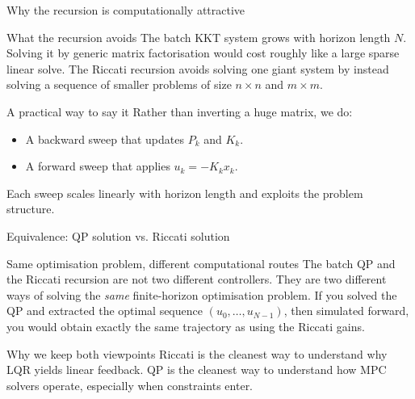 \documentclass[aspectratio=169,11pt]{beamer}
\begin{document}
\begin{frame}{Why the recursion is computationally attractive}
\begin{block}{What the recursion avoids}
The batch KKT system grows with horizon length $N$. Solving it by generic matrix factorisation would cost roughly like a large sparse linear solve.
The Riccati recursion avoids solving one giant system by instead solving a sequence of smaller problems of size $n\times n$ and $m\times m$.
\end{block}

\begin{exampleblock}{A practical way to say it}
Rather than inverting a huge matrix, we do:
\begin{itemize}
  \item A backward sweep that updates $P_k$ and $K_k$.
  \item A forward sweep that applies $u_k=-K_kx_k$.
\end{itemize}
Each sweep scales linearly with horizon length and exploits the problem structure.
\end{exampleblock}
\end{frame}

\begin{frame}{Equivalence: QP solution vs. Riccati solution}
\begin{block}{Same optimisation problem, different computational routes}
The batch QP and the Riccati recursion are not two different controllers. They are two different ways of solving the \emph{same} finite-horizon optimisation problem.
If you solved the QP and extracted the optimal sequence $(u_0,\dots,u_{N-1})$, then simulated forward, you would obtain exactly the same trajectory as using the Riccati gains.
\end{block}

\begin{alertblock}{Why we keep both viewpoints}
Riccati is the cleanest way to understand why LQR yields linear feedback.
QP is the cleanest way to understand how MPC solvers operate, especially when constraints enter.
\end{alertblock}
\end{frame}
\end{document}

